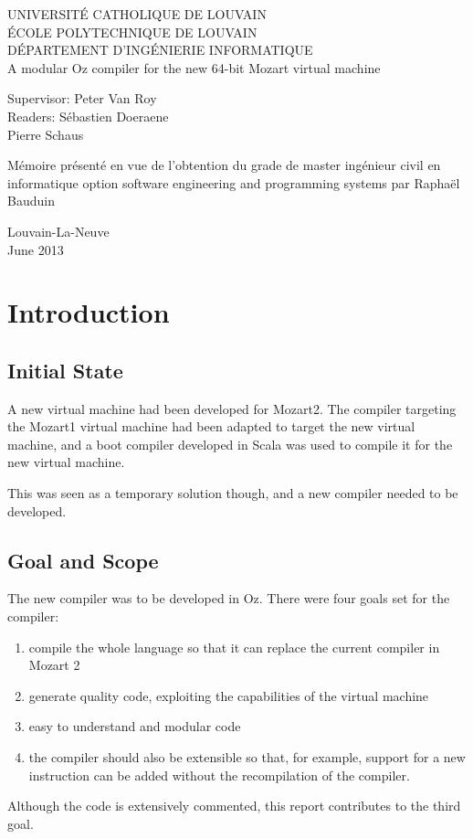 \documentclass[a4paper]{memoir}
\newcommand*{\titleMS}{\begingroup%
{

\pagestyle{empty}
\centering 
{\LARGE UNIVERSITÉ CATHOLIQUE DE LOUVAIN}\\
{\LARGE ÉCOLE POLYTECHNIQUE DE LOUVAIN}\\
{\LARGE DÉPARTEMENT D'INGÉNIERIE INFORMATIQUE}\\[2\baselineskip]
\vspace{0.2\textheight}
{\LARGE A modular Oz compiler for the new 64-bit Mozart virtual machine}\par
\vspace{0.2\textheight}
\begin{minipage}[t]{0.45\textwidth}
  Supervisor: Peter Van Roy\\
  Readers: \hspace{3.9mm}S\'{e}bastien Doeraene\\
  \hspace*{18.5mm}Pierre Schaus
\end{minipage}
\hspace{3mm}
\begin{minipage}[t]{0.55\textwidth}
  M\'{e}moire pr\'{e}sent\'{e} en vue de l'obtention du grade de master ing\'{e}nieur civil en informatique option software engineering and programming systems par Raphaël Bauduin
\end{minipage}
\vspace*{2cm}
\begin{minipage}[t]{\textwidth}
\vspace*{4cm}
\centering 

Louvain-La-Neuve\\
June 2013
\end{minipage}
} %
\endgroup}
\begin{document}
\newcommand{\nav}[1]{#1}
\renewcommand{\topfraction}{.85}
\renewcommand{\bottomfraction}{.7}
\renewcommand{\textfraction}{.15}
\renewcommand{\floatpagefraction}{.66}
\renewcommand{\dbltopfraction}{.66}
\renewcommand{\dblfloatpagefraction}{.66}
\setcounter{topnumber}{9}
\setcounter{bottomnumber}{9}
\setcounter{totalnumber}{20}
\setcounter{dbltopnumber}{9}

\lstset{language=Oz,basicstyle=\ttfamily\small,columns=fullflexible,keepspaces=true,
escapechar=µ}

\ifdraftdoc
{}
\fi

%
\frontmatter


\begin{titlingpage}
\titleMS
\end{titlingpage}


\tableofcontents

\mainmatter
\chapter{Introduction}
\section{Initial State}
A new virtual machine had been developed for Mozart2. The compiler
targeting the Mozart1 virtual machine had been adapted to target the new
virtual machine, and a boot compiler developed in Scala was used to compile it
for the new virtual machine.

This was seen as a temporary solution though, and a new compiler needed
to be developed. 


\section{Goal and Scope}
The new compiler was to be developed in Oz.
There were four goals set for the compiler:
\begin{enumerate}
  \item compile the whole language so that it can replace the current compiler in Mozart 2
  \item generate quality code, exploiting the capabilities of the virtual machine
  \item easy to understand and modular code
  \item the compiler should also be extensible so that, for example, support for a new instruction can be added without the recompilation of the compiler.
\end{enumerate}
Although the code is extensively commented, this report contributes to the third goal.
\end{document}
